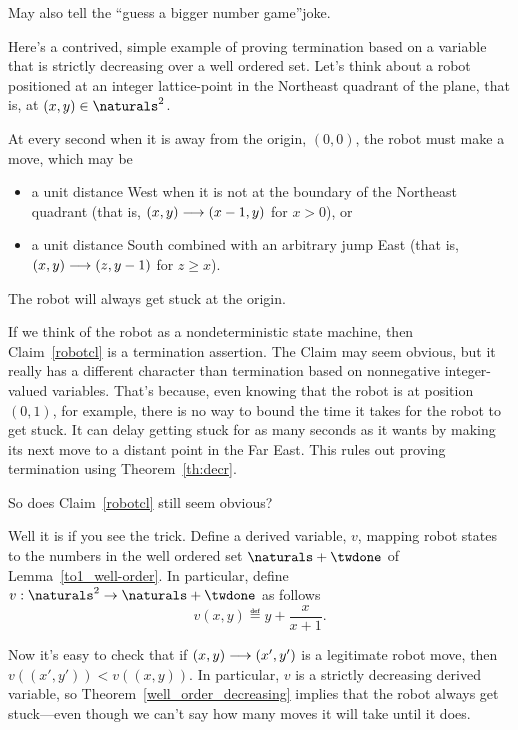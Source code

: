 May also tell the ``guess a bigger number game''joke.
\fi

Here's a contrived, simple example of proving termination based on a
variable that is strictly decreasing over a well ordered set.  Let's
think about a robot positioned at an integer lattice-point in the
Northeast quadrant of the plane, that is, at $(x,y) \in \naturals^2$.

At every second when it is away from the origin, $(0,0)$, the robot must
make a move, which may be
\begin{itemize}

\item a unit distance West when it is not at the boundary of the Northeast
  quadrant (that is, $(x,y) \mathrel{\longrightarrow} (x-1,y)$ for $x>0$), or

\item a unit distance South combined with an arbitrary jump East (that is,
     $(x,y) \mathrel{\longrightarrow} (z,y-1)$ for $z\geq x$).

\end{itemize}
\begin{claim}\label{robotcl}
The robot will always get stuck at the origin.
\end{claim}

If we think of the robot as a nondeterministic state machine, then
Claim~\ref{robotcl} is a termination assertion.  The Claim may seem
obvious, but it really has a different character than termination based on
nonnegative integer-valued variables.  That's because, even knowing that
the robot is at position $(0,1)$, for example, there is no way to bound
the time it takes for the robot to get stuck.  It can delay getting stuck
for as many seconds as it wants by making its next move to a distant point
in the Far East.  This rules out proving termination using
Theorem~\ref{th:decr}.

So does Claim~\ref{robotcl} still seem obvious?

Well it is if you see the trick.  Define a derived variable, $v$, mapping
robot states to the numbers in the well ordered set $\naturals + \twdone$
of Lemma~\ref{to1_well-order}.  In particular, define
$v:\naturals^2 \to \naturals + \twdone$ as follows
\[
v(x,y) \eqdef y + \frac{x}{x+1}.
\]

Now it's easy to check that if $(x,y)\mathrel{\longrightarrow} (x',y')$ is a legitimate
robot move, then $v((x',y')) < v((x,y))$.  In particular, $v$ is a
strictly decreasing derived variable, so
Theorem~\ref{well_order_decreasing} implies that the robot always get
stuck---even though we can't say how many moves it will take until it
does.

